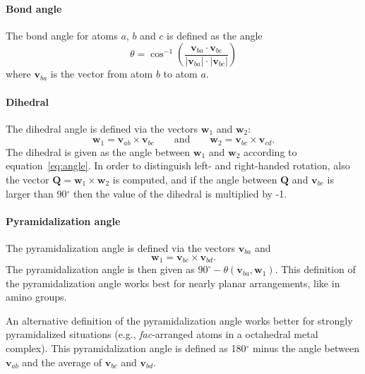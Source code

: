 \documentclass[a4paper,10pt,DIV=15,openany]{scrbook}
\newcommand{\VEC}[1]{\ensuremath{\mathbf{#1}}}
\begin{document}
\paragraph{Bond angle}

The bond angle for atoms $a$, $b$ and $c$ is defined as the angle
\begin{equation}
  \theta=
  \cos^{-1}\left(
    \frac{\VEC{v}_{ba}\cdot\VEC{v}_{bc}}{|\VEC{v}_{ba}|\cdot|\VEC{v}_{bc}|}
  \right)\label{eq:angle}
\end{equation}
where $\VEC{v}_{ba}$ is the vector from atom $b$ to atom $a$.

\paragraph{Dihedral}

The dihedral angle is defined via the vectors $\VEC{w}_1$ and $\VEC{w}_2$:
\begin{equation}
  \VEC{w}_1=\VEC{v}_{ab}\times\VEC{v}_{bc}\qquad\text{and}\qquad\VEC{w}_2=\VEC{v}_{bc}\times\VEC{v}_{cd}.
\end{equation}
The dihedral is given as the angle between $\VEC{w}_1$ and $\VEC{w}_2$ according to equation~\eqref{eq:angle}.
In order to distinguish left- and right-handed rotation, also the vector $\VEC{Q}=\VEC{w}_1\times\VEC{w}_2$ is computed, and if the angle between $\VEC{Q}$ and $\VEC{v}_{bc}$ is larger than 90$^\circ$ then the value of the dihedral is multiplied by -1.

\paragraph{Pyramidalization angle}

The pyramidalization angle is defined via the vectors $\VEC{v}_{ba}$ and 
\begin{equation}
  \VEC{w}_1=\VEC{v}_{bc}\times\VEC{v}_{bd}.
\end{equation}
The pyramidalization angle is then given as $90^\circ - \theta(\VEC{v}_{ba},\VEC{w}_1)$.
This definition of the pyramidalization angle works best for nearly planar arrangements, like in amino groups.

An alternative definition of the pyramidalization angle works better for strongly pyramidalized situations (e.g., \emph{fac}-arranged atoms in a octahedral metal complex).
This pyramidalization angle is defined as 180$^\circ$ minus the angle between $\VEC{v}_{ab}$ and the average of $\VEC{v}_{bc}$ and $\VEC{v}_{bd}$.
\end{document}
